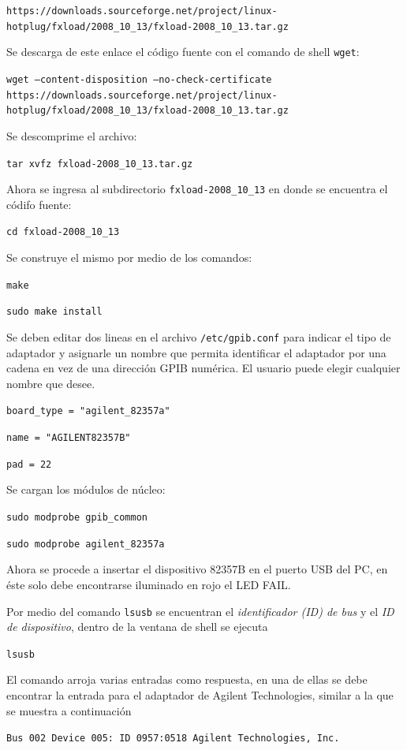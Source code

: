 \documentclass[paper=letter,oneside,fontsize=11pt, parskip=full]{scrartcl}
\begin{document}
		\texttt{https://downloads.sourceforge.net/project/linux-hotplug/fxload/2008\_10\_13/fxload-2008\_10\_13.tar.gz}
		
		Se descarga de este enlace el código fuente con el comando de shell \texttt{wget}:
		
		\texttt{wget --content-disposition --no-check-certificate https://downloads.sourceforge.net/project/linux-hotplug/fxload/2008\_10\_13/fxload-2008\_10\_13.tar.gz}
		
		Se descomprime el archivo:
		
		\texttt{tar xvfz fxload-2008\_10\_13.tar.gz}
		
		Ahora se ingresa al subdirectorio \texttt{fxload-2008\_10\_13} en donde se encuentra el códifo fuente:
		
		\texttt{cd fxload-2008\_10\_13}
		
		Se construye el mismo por medio de los comandos:
		
		\texttt{make}
		
		\texttt{sudo make install}
		
		Se deben editar dos lineas en el archivo \texttt{/etc/gpib.conf} para indicar el tipo de adaptador y asignarle un nombre que permita identificar el adaptador por una cadena en vez de una dirección GPIB numérica. El usuario puede elegir cualquier nombre que desee.
		
		\texttt{board\_type = "agilent\_82357a"}
		
		\texttt{name = "AGILENT82357B"}
		
		\texttt{pad = 22}
		
		Se cargan los módulos de núcleo:
		
		\texttt{sudo modprobe gpib\_common}
		
		\texttt{sudo modprobe agilent\_82357a}
		
		Ahora se procede a insertar el dispositivo 82357B en el puerto USB del PC, en éste solo debe encontrarse iluminado en rojo el LED FAIL. 
		
		Por medio del comando \texttt{lsusb} se encuentran el \emph{identificador (ID) de bus} y el \emph{ID de dispositivo}, dentro de la ventana de shell se ejecuta
		
		\texttt{lsusb}
		
		El comando arroja varias entradas como respuesta, en una de ellas se debe encontrar la entrada para el adaptador de Agilent Technologies, similar a la que se muestra a continuación
	
		\texttt{Bus 002 Device 005: ID 0957:0518 Agilent Technologies, Inc.}
		
\end{document}
